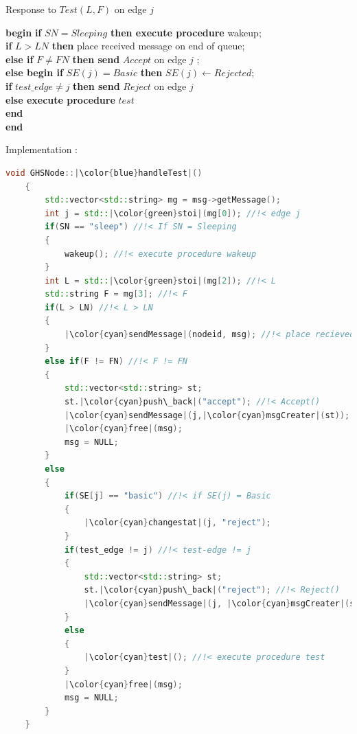 \documentclass[letterpaper,11pt]{article}
\begin{document}
	\begin{tcolorbox}
		Response to $Test(L,F)$ on edge $j$
		\begin{algorithmic}
			\STATE \textbf{begin} {\bf if} $SN = Sleeping$ {\bf then execute procedure }wakeup; \\
			{\quad \qquad  \bf if } $L > LN$ {\bf then} place received message on end of queue; \\
			{\quad \qquad \quad \bf else if} $F \neq FN$ {\bf then send} $Accept$ on edge $j$ ; \\
			{\qquad \qquad \qquad \qquad \bf else begin if} $SE(j) = Basic$ {\bf then} $SE(j) \leftarrow Rejected$; \\
			{\qquad \qquad \qquad \qquad \qquad \qquad \bf if} $test\_edge \neq j$ {\bf then send} $Reject$ on edge $j$ \\
			{\qquad \qquad \qquad \qquad \qquad \qquad \qquad \bf else execute procedure } $test$ \\
			{\bf \qquad \qquad \qquad \qquad \qquad end \\ end}
		\end{algorithmic}
	\end{tcolorbox}
	
	\bigskip 
	
	Implementation : 
	
	
	\begin{lstlisting}[language=C++, caption= handleTest()]
	void GHSNode::|\color{blue}handleTest|()
	{
		std::vector<std::string> mg = msg->getMessage();
		int j = std::|\color{green}stoi|(mg[0]); //!< edge j 
		if(SN == "sleep") //!< If SN = Sleeping 
		{
			wakeup(); //!< execute procedure wakeup
		}
		int L = std::|\color{green}stoi|(mg[2]); //!< L
		std::string F = mg[3]; //!< F
		if(L > LN) //!< L > LN
		{
			|\color{cyan}sendMessage|(nodeid, msg); //!< place recieved message on end of queue
		}
		else if(F != FN) //!< F != FN
		{
			std::vector<std::string> st;
			st.|\color{cyan}push\_back|("accept"); //!< Accept()
			|\color{cyan}sendMessage|(j,|\color{cyan}msgCreater|(st)); //!< Send Accept on edge j
			|\color{cyan}free|(msg); 
			msg = NULL;
		}
		else
		{
			if(SE[j] == "basic") //!< if SE(j) = Basic
			{
				|\color{cyan}changestat|(j, "reject");
			}
			if(test_edge != j) //!< test-edge != j
			{
				std::vector<std::string> st;
				st.|\color{cyan}push\_back|("reject"); //!< Reject()
				|\color{cyan}sendMessage|(j, |\color{cyan}msgCreater|(st)); //!< send Reject on edge j
			}
			else
			{
				|\color{cyan}test|(); //!< execute procedure test
			}
			|\color{cyan}free|(msg);
			msg = NULL;
		}
	}
	\end{lstlisting}
	
\end{document}
